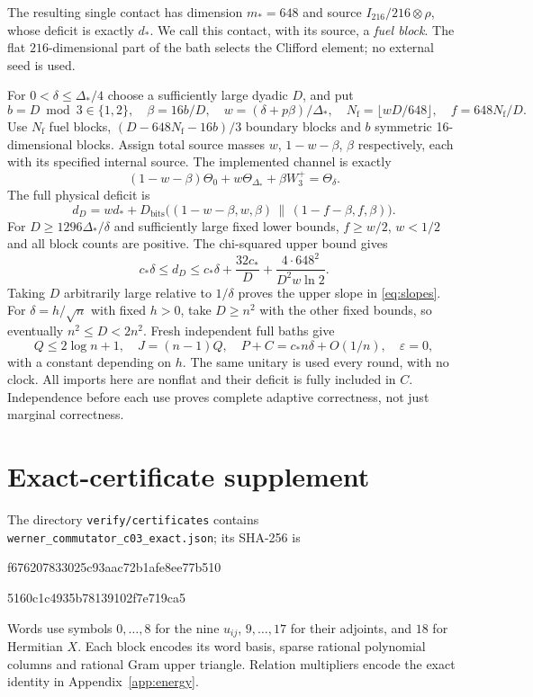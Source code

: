 \documentclass[11pt]{article}
\theoremstyle{definition}
\theoremstyle{remark}
\newcommand{\Wplus}{W_3^+}
\newcommand{\eps}{\varepsilon}
\begin{document}
The resulting single contact has dimension $m_*=648$ and source $I_{216}/216\otimes\rho$, whose deficit is exactly $d_*$. We call this contact, with its source, a \emph{fuel block}. The flat $216$-dimensional part of the bath selects the Clifford element; no external seed is used.

For $0<\delta\le\Delta_*/4$ choose a sufficiently large dyadic $D$, and put
\[
 b=D\bmod3\in\{1,2\},\quad\beta=16b/D,\quad
 w=(\delta+p\beta)/\Delta_*,\quad N_{\mathrm f}=\lfloor wD/648\rfloor,\quad f=648N_{\mathrm f}/D.
\]
Use $N_{\mathrm f}$ fuel blocks, $(D-648N_{\mathrm f}-16b)/3$ boundary blocks and $b$ symmetric 16-dimensional blocks. Assign total source masses $w$, $1-w-\beta$, $\beta$ respectively, each with its specified internal source. The implemented channel is exactly
\[
 (1-w-\beta)\Theta_0+w\Theta_{\Delta_*}+\beta\Wplus=\Theta_\delta.
\]
The full physical deficit is
\[
 d_D=w d_*+D_{\mathrm{bits}}\bigl((1-w-\beta,w,\beta)\,\big\|\,
                                  (1-f-\beta,f,\beta)\bigr).
\]
For $D\ge1296\Delta_*/\delta$ and sufficiently large fixed lower bounds, $f\ge w/2$, $w<1/2$ and all block counts are positive. The chi-squared upper bound gives
\[
 c_*\delta\le d_D
 \le c_*\delta+\frac{32c_*}{D}
                  +\frac{4\cdot648^2}{D^2w\ln2}.
\]
Taking $D$ arbitrarily large relative to $1/\delta$ proves the upper slope in \eqref{eq:slopes}. For $\delta=h/\sqrt n$ with fixed $h>0$, take $D\ge n^2$ with the other fixed bounds, so eventually $n^2\le D<2n^2$. Fresh independent full baths give
\[
 Q\le2\log n+1,\quad J=(n-1)Q,\quad
 P+C=c_*n\delta+O(1/n),\quad\eps=0,
\]
with a constant depending on $h$. The same unitary is used every round, with no clock. All imports here are nonflat and their deficit is fully included in $C$. Independence before each use proves complete adaptive correctness, not just marginal correctness.

\section{Exact-certificate supplement}\label{app:supplement}

The directory \texttt{verify/certificates} contains \texttt{werner\_commutator\_c03\_exact.json}; its SHA-256 is
\begin{center}\small\ttfamily
f676207833025c93aac72b1afe8ee77b510\par
5160c1c4935b78139102f7e719ca5
\end{center}
Words use symbols $0,\ldots,8$ for the nine $u_{ij}$, $9,\ldots,17$ for their adjoints, and $18$ for Hermitian $X$. Each block encodes its word basis, sparse rational polynomial columns and rational Gram upper triangle. Relation multipliers encode the exact identity in Appendix~\ref{app:energy}.
\end{document}
